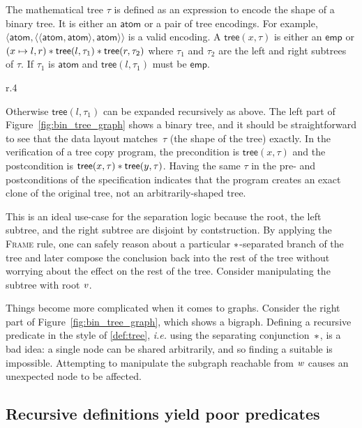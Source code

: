 The mathematical tree $\tau$ is defined as an expression to encode the
shape of a binary tree. It is either an $\mathsf{atom}$ or a pair of
tree encodings. For example,
$\langle \mathsf{atom}, \langle \langle \mathsf{atom}, \mathsf{atom} \rangle, \mathsf{atom} \rangle \rangle$
is a valid encoding. A $\mathsf{tree}(x, \tau)$ is either an
$\mathsf{emp}$ or $(x \mapsto
l,r) \mathbin{\ast} \mathsf{tree}(l, \tau_1) \mathbin{\ast} \mathsf{tree}(r, \tau_2)$
where $\tau_1$ and $\tau_2$ are the left and right subtrees of $\tau$.
If $\tau_1$ is $\mathsf{atom}$  and
$\mathsf{tree}(l, \tau_1)$ must be $\mathsf{emp}$.
\begin{wrapfigure}{r}{.4\textwidth}
  \centering
  
  \caption{A Binary Tree and a Binary Graph}\label{fig:bin_tree_graph}
\end{wrapfigure}
Otherwise $\mathsf{tree}(l, \tau_1)$ can be expanded recursively as above.
The left part of Figure~\ref{fig:bin_tree_graph} shows a binary tree, 
and it should be straightforward to see that the data layout matches~$\tau$ 
(the shape of the tree) exactly. In the verification of a tree
copy program, the precondition is $\mathsf{tree}(x, \tau)$ and the
postcondition is
$\mathsf{tree}(x, \tau) \mathbin{\ast} \mathsf{tree}(y, \tau)$. 
Having the same $\tau$ in the pre- and postconditions
of the specification indicates that the program creates an exact clone
of the original tree, not an arbitrarily-shaped tree. 

This is an ideal use-case for the separation logic
because the root, the left subtree, 
and the right subtree are disjoint by contstruction. By applying
the \textsc{Frame} rule, one can safely reason about a particular 
$\mathbin{\ast}$-separated branch of the tree and later compose the 
conclusion back into the rest of the tree
without worrying about the effect on the rest of the tree. 
Consider manipulating the subtree with root $\mathit{v}$.

Things become more complicated when it comes to graphs.
Consider the right part of Figure~\ref{fig:bin_tree_graph},
which shows a bigraph. 
Defining a recursive predicate in the style of \eqref{def:tree},
\emph{i.e.} using the separating conjunction~$\mathbin{\ast}$, is a bad idea: 
a single node can be shared arbitrarily, and so finding a suitable 
 is impossible. 
Attempting to manipulate the subgraph reachable from $\mathit{w}$ causes 
an unexpected node to be affected.

\subsection{Recursive definitions yield poor  predicates}\label{sec:fixpointfail}

